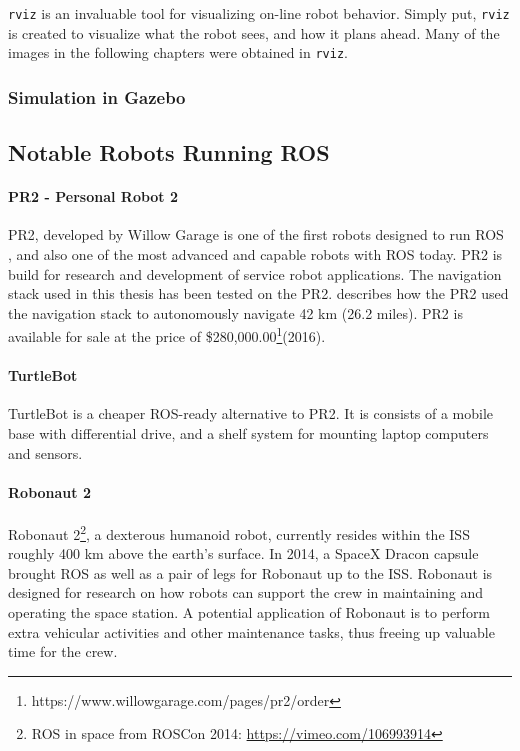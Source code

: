 \texttt{rviz} is an invaluable tool for visualizing on-line robot behavior. Simply put, \texttt{rviz} is created to visualize what the robot sees, and how it plans ahead. Many of the images in the following chapters were obtained in \texttt{rviz}. 

\subsubsection{Simulation in Gazebo}


\subsection{Notable Robots Running ROS}

\paragraph{PR2 - Personal Robot 2}

PR2, developed by Willow Garage is one of the first robots designed to run \ac{ROS} \cite{rosbook15}, and also one of the most advanced and capable robots with \ac{ROS} today. PR2 is build for research and development of service robot applications. The navigation stack used in this thesis has been tested on the PR2. \cite{tbd} describes how the PR2 used the navigation stack to autonomously navigate 42 km (26.2 miles). PR2 is available for sale at the price of \$280,000.00\footnote{https://www.willowgarage.com/pages/pr2/order}(2016).

\paragraph{TurtleBot} 

TurtleBot is a cheaper ROS-ready alternative to PR2. It is consists of a mobile base with differential drive, and a shelf system for mounting laptop computers and sensors.

\paragraph{Robonaut 2}

Robonaut 2\footnote{\ac{ROS} in space from ROSCon 2014: \url{https://vimeo.com/106993914}}, a dexterous humanoid robot, currently resides within the \ac{ISS} roughly 400 km above the earth's surface. In 2014, a SpaceX Dracon capsule brought \ac{ROS} as well as a pair of legs for Robonaut up to the \ac{ISS}\cite{ROS_space}. Robonaut is designed for research on how robots can support the crew in maintaining and operating the space station. A potential application of Robonaut is to perform extra vehicular activities and other maintenance tasks, thus freeing up valuable time for the crew.

